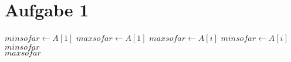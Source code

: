 \documentclass{article}
\begin{document}
\section{Aufgabe 1}

\begin{algorithm}
\begin{algorithmic}
\State $minsofar \gets A[1]$
\State $maxsofar \gets A[1]$
	\State $maxsofar \gets A[i]$
	\State $minsofar \gets A[i]$
	\EndIf 
\EndFor \\
\Return $minsofar$ \\
\Return $maxsofar$
\EndFunction
\end{algorithmic}
\end{algorithm}
\end{document}
